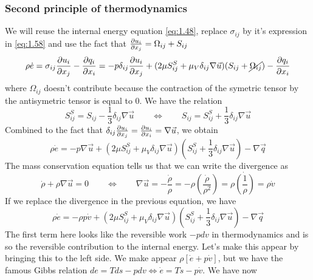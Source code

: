 		\subsubsection{Second principle of thermodynamics}
			We will reuse the internal energy equation \eqref{eq:1.48}, replace $\sigma _{ij}$ by it's expression in \eqref{eq:1.58} and use the fact that $\frac{\partial u_i}{\partial x_j} = \Omega _{ij} + S_{ij}$
			\begin{equation}
				\rho \dot{e} = \sigma _{ij} \frac{\partial u_i}{\partial x_j} - \frac{\partial q_i}{\partial x_i} = -p \delta _{ij} \frac{\partial u_i}{\partial x_j} + (2\mu S_{ij}^S + \mu _V \delta _{ij} \nabla \vec{u})(S_{ij}+\cancel{\Omega _{ij}}) - \frac{\partial q_i}{\partial x_i}
			\end{equation}
			where $\Omega _{ij}$ doesn't contribute because the contraction of the symetric tensor by the antisymetric tensor is equal to 0.  We have the relation 
			\begin{equation}
			S_{ij}^S = S_{ij}-\frac{1}{3}\delta _{ij}\nabla \vec{u} \qquad \Leftrightarrow \qquad S_{ij} = S_{ij}^S + \frac{1}{3}\delta _{ij}\nabla \vec{u}
	  		\end{equation}
	  		Combined to the fact that $\delta _{ij} \frac{\partial u_i}{\partial x_j} = \frac{\partial u_i}{\partial x_i} = \nabla \vec{u}$, we obtain
	  		\begin{equation}
	  			\rho \dot{e} = -p \nabla \vec{u} + (2\mu S_{ij}^S + \mu _V \delta _{ij} \nabla \vec{u})\left( S_{ij}^S + \frac{1}{3}\delta _{ij}\nabla \vec{u}\right) - \nabla \vec{q}
	  		\end{equation}
	  		The mass conservation equation tells us that we can write the divergence as 
	  		\begin{equation}
	  			\dot{\rho} + \rho \nabla \vec{u} = 0 \qquad \Leftrightarrow \qquad \nabla \vec{u} = -\frac{\dot{\rho}}{\rho} = -\rho \left( \frac{\dot{\rho}}{\rho ^2}\right) = \rho \dot{\left( \frac{1}{\rho}\right)} = \rho \dot{v}
	  			\label{eq:1.70}
	  		\end{equation}
	  		If we replace the divergence in the previous equation, we have
	  		\begin{equation}
	  			\rho \dot{e} = -\rho p \dot{v} + (2\mu S_{ij}^S + \mu _V \delta _{ij} \nabla \vec{u})\left(S_{ij}^S + \frac{1}{3}\delta _{ij}\nabla \vec{u}\right) - \nabla \vec{q}
	  		\end{equation}
	  		The first term here looks like the reversible work $-pdv$ in thermodynamics and is so the reversible contribution to the internal energy. Let's make this appear by bringing this to the left side. We make appear $\rho [\dot{e} + p\dot{v}]$, but we have the famous Gibbs relation $de = Tds - pdv \Leftrightarrow \dot{e} = T\dot{s}-p\dot{v}$. We have now 
